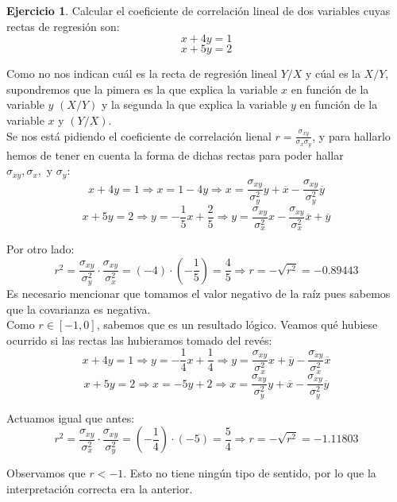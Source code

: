 \documentclass[a4paper, 12pt]{article}
\theoremstyle{definition}
\newtheorem{ej}{Ejercicio}
\begin{document}
\begin{ej}
Calcular el coeficiente de correlación lineal de dos variables cuyas rectas de regresión son:
\[
	x + 4y = 1
\]
\[
	x + 5y = 2
\]

Como no nos indican cuál es la recta de regresión lineal \(Y/X\) y cúal es la \(X/Y\), supondremos que la pimera es la que explica la variable \(x\) en función de la variable \(y\) \((X/Y)\) y la segunda la que explica la variable \(y\) en función de la variable \(x\) y \((Y/X)\). \\

Se nos está pidiendo el coeficiente de correlación lienal \(r = \frac{\sigma_{xy}}{\sigma_x \sigma_y}\), y para hallarlo hemos de tener en cuenta la forma de dichas rectas para poder hallar \(\sigma_{xy}, \sigma_x, \text{ y } \sigma_y\):
\[
	x + 4y = 1 \Rightarrow x = 1 - 4y \Rightarrow x = \frac{\sigma_{xy}}{\sigma_y^2}y + \overline{x} - \frac{\sigma_{xy}}{\sigma_y^2} \overline{y}
\]
\[
	x +5y = 2 \Rightarrow y = - \frac{1}{5}x + \frac{2}{5} \Rightarrow y = \frac{\sigma_{xy}}{\sigma_x^2}x -\frac{\sigma_{xy}}{\sigma_x^2} \overline{x} + \overline{y}
\]

Por otro lado:
\[
	r^2 = \frac{\sigma_{xy}}{\sigma_y^2} \cdot \frac{\sigma_{xy}}{\sigma_x^2} = (-4) \cdot (-\frac{1}{5}) = \frac{4}{5} \Rightarrow r = -\sqrt{r^2} = -0.89443
\]
Es necesario mencionar que tomamos el valor negativo de la raíz pues sabemos que la covarianza es negativa. \\

Como \(r \in [-1, 0]\), sabemos que es un resultado lógico. Veamos qué hubiese ocurrido si las rectas las hubieramos tomado del revés:
\[
	x + 4y = 1 \Rightarrow y = - \frac{1}{4}x + \frac{1}{4} \Rightarrow y = \frac{\sigma_{xy}}{\sigma_x^2}x + \overline{y} - \frac{\sigma_{xy}}{\sigma_x^2} \overline{x}
\]
\[
	x + 5y = 2 \Rightarrow x = -5y +2 \Rightarrow x = \frac{\sigma_{xy}}{\sigma_y^2}y + \overline{x} - \frac{\sigma_{xy}}{\sigma_y^2} \overline{y}
\]

Actuamos igual que antes:
\[
	r^2 = \frac{\sigma_{xy}}{\sigma_x^2} \cdot \frac{\sigma_{xy}}{\sigma_y^2} = (-\frac{1}{4}) \cdot (-5) = \frac{5}{4} \Rightarrow r = -\sqrt{r^2} = -1.11803
\]

Observamos que \(r < -1\). Esto no tiene ningún tipo de sentido, por lo que la interpretación correcta era la anterior.
\end{ej}

\vspace{2mm}
\end{document}
